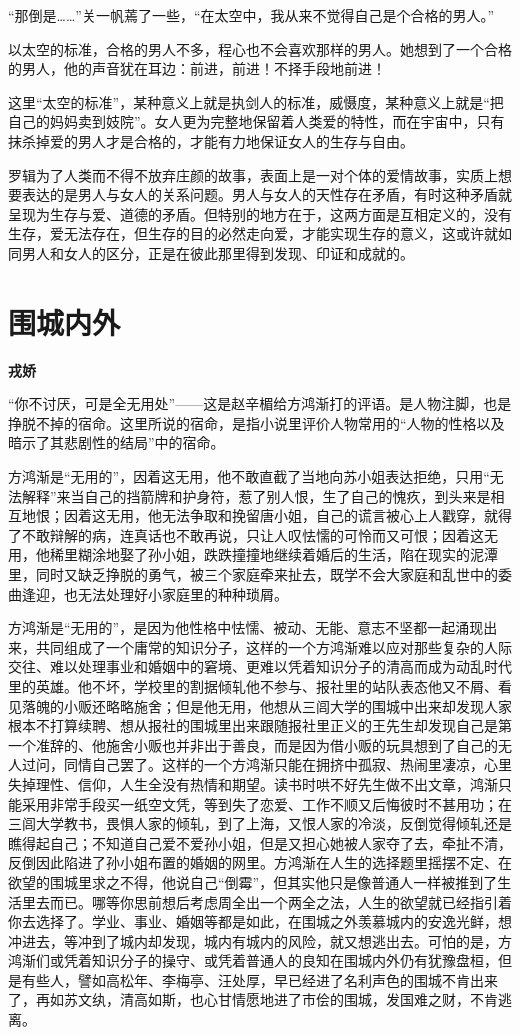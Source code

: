 \documentclass[openany,scheme = chinese, linespread = 1.5]{ctexbook}
\newcommand \name[1]{\begin{center} \kaishu \Large \bfseries #1 \end{center}}
\begin{document}
“那倒是……”关一帆蔫了一些，“在太空中，我从来不觉得自己是个合格的男人。” 

以太空的标准，合格的男人不多，程心也不会喜欢那样的男人。她想到了一个合格的男人，他的声音犹在耳边：前进，前进！不择手段地前进！

这里“太空的标准”，某种意义上就是执剑人的标准，威慑度，某种意义上就是“把自己的妈妈卖到妓院”。女人更为完整地保留着人类爱的特性，而在宇宙中，只有抹杀掉爱的男人才是合格的，才能有力地保证女人的生存与自由。

罗辑为了人类而不得不放弃庄颜的故事，表面上是一对个体的爱情故事，实质上想要表达的是男人与女人的关系问题。男人与女人的天性存在矛盾，有时这种矛盾就呈现为生存与爱、道德的矛盾。但特别的地方在于，这两方面是互相定义的，没有生存，爱无法存在，但生存的目的必然走向爱，才能实现生存的意义，这或许就如同男人和女人的区分，正是在彼此那里得到发现、印证和成就的。
\newpage
\section{围城内外}
\name{戎娇}
“你不讨厌，可是全无用处”——这是赵辛楣给方鸿渐打的评语。是人物注脚，也是挣脱不掉的宿命。这里所说的宿命，是指小说里评价人物常用的“人物的性格以及暗示了其悲剧性的结局”中的宿命。

方鸿渐是“无用的”，因着这无用，他不敢直截了当地向苏小姐表达拒绝，只用“无法解释”来当自己的挡箭牌和护身符，惹了别人恨，生了自己的愧疚，到头来是相互地恨；因着这无用，他无法争取和挽留唐小姐，自己的谎言被心上人戳穿，就得了不敢辩解的病，连真话也不敢再说，只让人叹怯懦的可怜而又可恨；因着这无用，他稀里糊涂地娶了孙小姐，跌跌撞撞地继续着婚后的生活，陷在现实的泥潭里，同时又缺乏挣脱的勇气，被三个家庭牵来扯去，既学不会大家庭和乱世中的委曲逢迎，也无法处理好小家庭里的种种琐屑。

方鸿渐是“无用的”，是因为他性格中怯懦、被动、无能、意志不坚都一起涌现出来，共同组成了一个庸常的知识分子，这样的一个方鸿渐难以应对那些复杂的人际交往、难以处理事业和婚姻中的窘境、更难以凭着知识分子的清高而成为动乱时代里的英雄。他不坏，学校里的割据倾轧他不参与、报社里的站队表态他又不屑、看见落魄的小贩还略略施舍；但是他无用，他想从三闾大学的围城中出来却发现人家根本不打算续聘、想从报社的围城里出来跟随报社里正义的王先生却发现自己是第一个准辞的、他施舍小贩也并非出于善良，而是因为借小贩的玩具想到了自己的无人过问，同情自己罢了。这样的一个方鸿渐只能在拥挤中孤寂、热闹里凄凉，心里失掉理性、信仰，人生全没有热情和期望。读书时哄不好先生做不出文章，鸿渐只能采用非常手段买一纸空文凭，等到失了恋爱、工作不顺又后悔彼时不甚用功；在三闾大学教书，畏惧人家的倾轧，到了上海，又恨人家的冷淡，反倒觉得倾轧还是瞧得起自己；不知道自己爱不爱孙小姐，但是又担心她被人家夺了去，牵扯不清，反倒因此陷进了孙小姐布置的婚姻的网里。方鸿渐在人生的选择题里摇摆不定、在欲望的围城里求之不得，他说自己“倒霉”，但其实他只是像普通人一样被推到了生活里去而已。哪等你思前想后考虑周全出一个两全之法，人生的欲望就已经指引着你去选择了。学业、事业、婚姻等都是如此，在围城之外羡慕城内的安逸光鲜，想冲进去，等冲到了城内却发现，城内有城内的风险，就又想逃出去。可怕的是，方鸿渐们或凭着知识分子的操守、或凭着普通人的良知在围城内外仍有犹豫盘桓，但是有些人，譬如高松年、李梅亭、汪处厚，早已经进了名利声色的围城不肯出来了，再如苏文纨，清高如斯，也心甘情愿地进了市侩的围城，发国难之财，不肯逃离。
\end{document}
